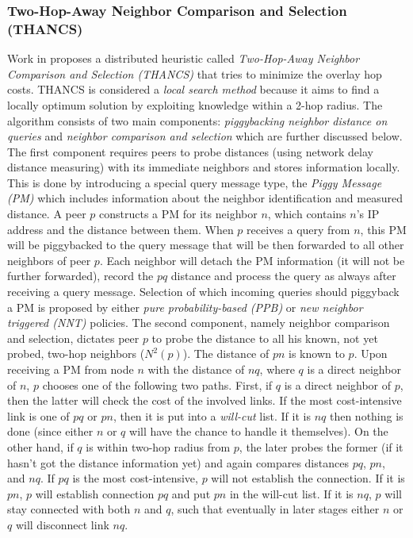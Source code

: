 \subsubsection{Two-Hop-Away Neighbor Comparison and Selection (THANCS)}
Work in \cite{LNXE2005,L2008} proposes a distributed heuristic
called \emph{Two-Hop-Away Neighbor Comparison and Selection (THANCS)} that
tries to minimize the overlay hop costs. THANCS is considered a \emph{local
search method} because it aims to find a locally optimum
solution by exploiting knowledge within a 2-hop radius. The algorithm consists
of two main components: \emph{piggybacking neighbor distance on queries} and
\emph{neighbor comparison and selection} which are further discussed below.
The first component requires peers to probe distances (using network delay
distance measuring) with its immediate neighbors and stores information
locally. This is done by introducing a special query message type, the
\emph{Piggy Message (PM)} which includes information about the neighbor
identification and measured distance. A peer $p$ constructs a PM for its
neighbor $n$, which contains $n$'s IP address and the distance between them.
When $p$ receives a query from $n$, this PM will be piggybacked to the query
message that will be then forwarded to all other neighbors of peer $p$. 
Each neighbor will detach the PM information (it will not be further forwarded),
record the $pq$ distance and process the query as always after receiving a query
message. Selection of which incoming queries should piggyback a PM is proposed
by either \emph{pure probability-based (PPB)} or \emph{new neighbor triggered
(NNT)} policies. The second component, namely neighbor comparison and selection,
dictates peer $p$ to probe the distance to all his known, not yet probed,
two-hop neighbors ($ N^2(p)$). The distance of $pn$ is known to $p$. Upon
receiving a PM from node $n$ with the distance of $nq$, where $q$ is a direct
neighbor of $n$, $p$ chooses one of the following two paths. First, if $q$ is a
direct neighbor of $p$, then the latter will check the cost of the involved
links. If the most cost-intensive link is one of $pq$ or $pn$, then it is put
into a \emph{will-cut} list. If it is $nq$ then nothing is done (since either
$n$ or $q$ will have the chance to handle it themselves).  On the other hand, if
$q$ is within two-hop radius from $p$, the later probes the former (if it hasn't
got the distance information yet) and again compares distances $pq$, $pn$, and
$nq$. If $pq$ is the most cost-intensive, $p$ will not establish the connection.
If it is $pn$, $p$ will establish connection $pq$ and put $pn$ in the will-cut
list. If it is $nq$, $p$ will stay connected with both $n$ and $q$,
such that eventually in later stages either $n$ or $q$ will disconnect link $nq$.

